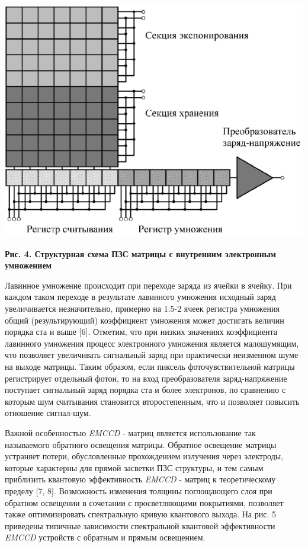 \documentclass[11pt]{article}
\begin{document}
\includegraphics[width=0.8\linewidth]{8.png}
\begin{center}
\textbf{Рис. 4. Структурная схема ПЗС матрицы с внутренним электронным умножением}
\end{center}
Лавинное умножение происходит при переходе заряда из ячейки в ячейку. При каждом таком переходе в результате лавинного умножения исходный заряд увеличивается незначительно, примерно на 1.5-2%
ячеек регистра умножения общий (результирующий) коэффициент умножения может достигать величин порядка ста и выше [6]. Отметим, что при низких значениях коэффициента лавинного умножения процесс электронного умножения является малошумящим, что позволяет увеличивать сигнальный заряд при практически неизменном шуме на выходе матрицы. Таким образом, если пиксель фоточувствительной матрицы регистрирует отдельный фотон, то на вход преобразователя заряд-напряжение поступает сигнальный заряд порядка ста и более
электронов, по сравнению с которым шум считывания становится второстепенным, что и позволяет повысить отношение сигнал-шум.

Важной особенностью \textit{EMCCD} - матриц является использование так называемого обратного освещения матрицы. Обратное освещение матрицы устраняет потери, обусловленные прохождением излучения через электроды, которые характерны для прямой засветки ПЗС структуры, и тем самым приблизить квантовую эффективность \textit{EMCCD} - матриц к теоретическому пределу [7, 8]. Возможность изменения толщины поглощающего слоя при обратном освещении в сочетании с просветляющими покрытиями, позволяет также оптимизировать спектральную кривую квантового выхода. На рис. 5 приведены типичные зависимости спектральной квантовой эффективности \textit {EMCCD} устройств с обратным и прямым освещением.
\end{document}
